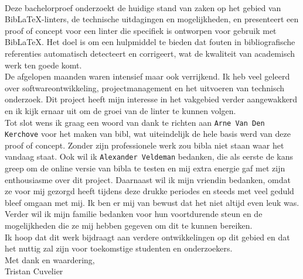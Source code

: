 \\ \newline{}
Deze bachelorproef onderzoekt de huidige stand van zaken op het gebied van BibLaTeX-linters, de technische uitdagingen en mogelijkheden, en presenteert een proof of concept voor een linter die specifiek is ontworpen voor gebruik met BibLaTeX. Het doel is om een hulpmiddel te bieden dat fouten in bibliografische referenties automatisch detecteert en corrigeert, wat de kwaliteit van academisch werk ten goede komt.
\\ \newline{}
De afgelopen maanden waren intensief maar ook verrijkend. Ik heb veel geleerd over softwareontwikkeling, projectmanagement en het uitvoeren van technisch onderzoek. Dit project heeft mijn interesse in het vakgebied verder aangewakkerd en ik kijk ernaar uit om de groei van de linter te kunnen volgen.
\\ \newline{}
Tot slot wens ik graag een woord van dank te richten aan \texttt{Arne Van Den Kerchove} voor het maken van bibl, wat uiteindelijk de hele basis werd van deze proof of concept. Zonder zijn professionele werk zou bibla niet staan waar het vandaag staat. Ook wil ik \texttt{Alexander Veldeman} bedanken, die als eerste de kans greep om de online versie van bibla te testen en mij extra energie gaf met zijn enthousiasme over dit project. Daarnaast wil ik mijn vriendin bedanken, omdat ze voor mij gezorgd heeft tijdens deze drukke periodes en steeds met veel geduld bleef omgaan met mij. Ik ben er mij van bewust dat het niet altijd even leuk was.
\\ \newline{}
Verder wil ik mijn familie bedanken voor hun voortdurende steun en de mogelijkheden die ze mij hebben gegeven om dit te kunnen bereiken.
\\ \newline{}
Ik hoop dat dit werk bijdraagt aan verdere ontwikkelingen op dit gebied en dat het nuttig zal zijn voor toekomstige studenten en onderzoekers.
\\ \newline{}
Met dank en waardering,
\\ \newline{}
Tristan Cuvelier


